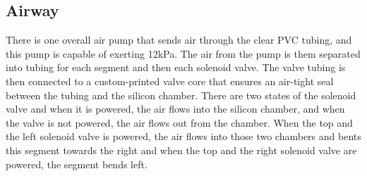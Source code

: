 \documentclass[twoside]{article}
\begin{document}
\subsection{Airway}
There is one overall air pump that sends air through the clear PVC tubing, and this pump is capable of exerting 12kPa. The air from the pump is them separated into tubing for each segment and then each solenoid valve. The valve tubing is then connected to a custom-printed valve core that ensures an air-tight seal between the tubing and the silicon chamber. There are two states of the solenoid valve and when it is powered, the air flows into the silicon chamber, and when the valve is not powered, the air flows out from the chamber. When the top and the left solenoid valve is powered, the air flows into those two chambers and bents this segment towards the right and when the top and the right solenoid valve are powered, the segment bends left. 
\end{document}
